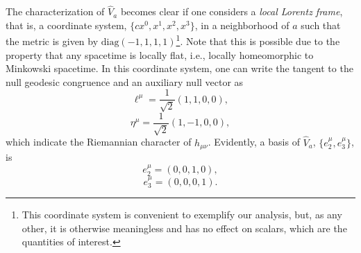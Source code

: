\documentclass[
12pt,		%
openright,	%
twoside,  %
a4paper,			%
chapter=TITLE,		%
english,			%
french,				%
spanish,			%
brazil				%
]{USPSC-classe/USPSC}
\begin{document}
The characterization of $\hat{V}_a$ becomes clear if one considers a \textit{local Lorentz frame}, that is, a coordinate system, $\{cx^0,x^1,x^2,x^3\}$, in a neighborhood of $a$ such that the metric is given by $\text{diag}(-1,1,1,1)$\footnote{This coordinate system is convenient to exemplify our analysis, but, as any other, it is otherwise meaningless and has no effect on scalars, which are the quantities of interest.}. Note that this is possible due to the property that any spacetime is locally flat, i.e., locally homeomorphic to Minkowski spacetime. In this coordinate system, one can write the tangent to the null geodesic congruence and an auxiliary null vector as
\begin{equation}\label{eq40}
    \ell^{\mu}=\frac{1}{\sqrt{2}}(1,1,0,0), 
\end{equation}
\begin{equation}\label{eq41}
    \eta^{\mu}=\frac{1}{\sqrt{2}}(1,-1,0,0),
\end{equation}
which indicate the Riemannian character of $h_{\mu\nu}$. Evidently, a basis of $\hat{V}_a$, $\{e^{\mu}_2,e^{\mu}_3\}$, is
\begin{equation}\label{eq43}
    e^{\mu}_2=(0,0,1,0), 
\end{equation}
\begin{equation}\label{eq42}
    e^{\mu}_3=(0,0,0,1).
\end{equation}
\end{document}
